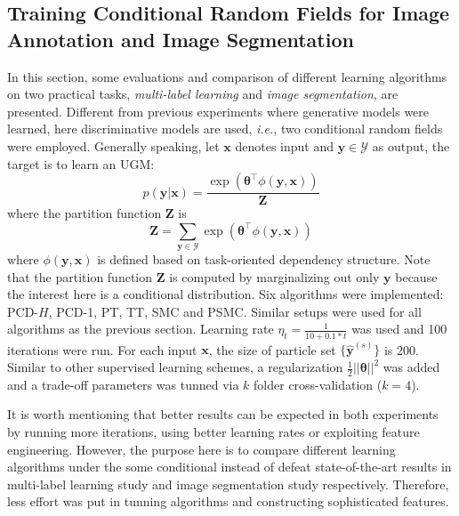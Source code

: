 \subsection {Training Conditional Random Fields for Image Annotation and Image Segmentation}
\label{subsec:graph_experiment}
In this section, some evaluations and comparison of different learning algorithms on two practical tasks, \emph{multi-label learning} and \emph{image 
segmentation}, are presented. Different from previous experiments where generative models were learned, here discriminative models are used, \emph{i.e.}, two 
conditional random fields were employed. Generally speaking, let $\mathbf{x}$ denotes input and $\mathbf{y}\in \mathcal{Y}$ as output, the target is to 
learn an UGM:  
\begin{equation}
	p(\mathbf{y}|\mathbf{x})=\frac{\exp(\boldsymbol{\theta}^\top \phi(\mathbf{y},\mathbf{x}))}{\mathbf{Z}}
\end{equation}
where the partition function $\mathbf{Z}$ is
\begin{equation}
	\mathbf{Z}=\sum_{\mathbf{y}\in\mathcal{Y}}\exp(\boldsymbol{\theta}^\top \phi(\mathbf{y},\mathbf{x}))
\end{equation}
where $\phi(\mathbf{y},\mathbf{x})$ is defined based on task-oriented dependency structure. Note that the partition function $\mathbf{Z}$ is computed by 
marginalizing out only $\mathbf{y}$ because the interest here is a conditional distribution. Six algorithms 
were implemented: PCD-$H$, PCD-1, PT, TT, SMC and PSMC. Similar setups were used for all algorithms as the previous section.  
Learning rate $\eta_t=\frac{1}{10+0.1*t}$ was used and 100 iterations were run. For each input $\mathbf{x}$, 
the size of particle set $\{ \hat{\mathbf{y}}^{(s)}\}$ is 200.  Similar to other supervised learning schemes, a regularization $\frac{1}{2}||\boldsymbol{\theta}||^2$ 
was added and a trade-off parameters was tunned via $k$ folder cross-validation ($k=4$).  

It is worth mentioning that better results can be expected in both experiments by running more iterations, using better learning rates or exploiting 
feature engineering. However, the purpose here is to compare different learning algorithms under the some conditional instead of defeat state-of-the-art 
results in multi-label learning study and image segmentation study respectively. Therefore, less effort was put in tunning algorithms and constructing 
sophisticated features. 

